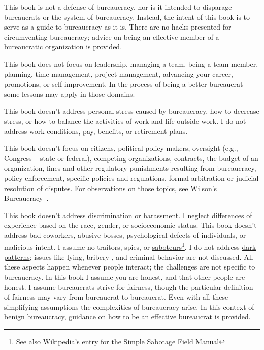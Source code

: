 This book is not a defense of bureaucracy, nor is it intended to disparage bureaucrats or the system of bureaucracy. Instead, the intent of this book is to serve as a guide to bureaucracy-as-it-is. There are no hacks presented for circumventing bureaucracy; advice on being an effective member of a bureaucratic organization is provided.

This book does not focus on leadership, managing a team, being a team member, planning, time management, project management, advancing your career, promotions, or self-improvement. In the process of being a better bureaucrat some lessons may apply in those domains.

This book doesn't address personal stress caused by bureaucracy, how to decrease stress, or how to balance the activities of work and life-outside-work.  I do not address work conditions, pay, benefits, or retirement plans.


This book doesn't focus on citizens, political policy makers, oversight (e.g., Congress -- state or federal), competing organizations, contracts, the budget of an organization, fines and other regulatory punishments resulting from bureaucracy, policy enforcement, specific policies and regulations, formal arbitration or judicial resolution of disputes. For observations on those topics, see Wilson's Bureaucracy~\cite{1991_Wilson}.

This book doesn't address discrimination or harassment. I neglect differences of experience based on the race, gender, or socioeconomic status. This book doesn't address bad coworkers, abusive bosses, psychological defects of individuals, or malicious intent. I assume no traitors, spies, or \href{https://www.hsdl.org/?abstract&did=750070}{saboteurs}\footnote{See also Wikipedia's entry for the \href{https://en.wikisource.org/wiki/Simple_Sabotage_Field_Manual}{Simple Sabotage Field Manual}}.
I do not address \href{https://en.wikipedia.org/wiki/Dark_pattern}{dark patterns}; issues like lying, bribery \cite{2021_Ang}, and criminal behavior are not discussed. All these aspects happen whenever people interact; the challenges are not specific to bureaucracy. In this book I assume you are honest, and that other people are honest.  
I assume bureaucrats strive for fairness, though the particular definition of fairness may vary from bureaucrat to bureaucrat. 
Even with all these simplifying assumptions the complexities of bureaucracy arise. In this context of benign bureaucracy, guidance on how to be an effective bureaucrat is provided.


